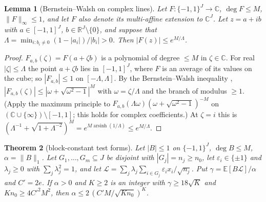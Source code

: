 \documentclass[11pt]{amsart}
\newtheorem{theorem}{Theorem}[section]
\newtheorem{lemma}[theorem]{Lemma}
\theoremstyle{definition}
\newcommand{\R}{\mathbb{R}}
\newcommand{\C}{\mathbb{C}}
\newcommand{\E}{\mathbb{E}}
\newcommand{\arsinh}{\operatorname{arsinh}}
\begin{document}
\begin{lemma}[Bernstein--Walsh on complex lines]\label{lem:BW}
Let $F:\{-1,1\}^J\to\C$, $\deg F\le M$, $\|F\|_\infty\le1$, and let $F$ also denote its multi-affine extension to $\C^J$. Let $z=a+ib$ with $a\in[-1,1]^J$, $b\in\R^J\setminus\{0\}$, and suppose that $\Lambda=\min_{i:b_i\ne0}(1-|a_i|)/|b_i|>0$. Then $|F(z)|\le e^{M/\Lambda}$.
\end{lemma}

\begin{proof}
$F_{a,b}(\zeta)=F(a+\zeta b)$ is a polynomial of degree $\le M$ in $\zeta\in\C$. For real $|\zeta|\le\Lambda$ the point $a+\zeta b$ lies in $[-1,1]^J$, where $F$ is an average of its values on the cube; so $|F_{a,b}|\le1$ on $[-\Lambda,\Lambda]$. By the Bernstein--Walsh inequality \cite[Thm.~5.5.7]{Ran}, $|F_{a,b}(\zeta)|\le|\omega+\sqrt{\omega^2-1}|^M$ with $\omega=\zeta/\Lambda$ and the branch of modulus $\ge1$. (Apply the maximum principle to $F_{a,b}(\Lambda\omega)(\omega+\sqrt{\omega^2-1})^{-M}$ on $(\C\cup\{\infty\})\setminus[-1,1]$; this holds for complex coefficients.) At $\zeta=i$ this is $(\Lambda^{-1}+\sqrt{1+\Lambda^{-2}})^M=e^{M\arsinh(1/\Lambda)}\le e^{M/\Lambda}$.
\end{proof}

\begin{theorem}[block-constant test forms]\label{thm:F}
Let $|B|\le1$ on $\{-1,1\}^J$, $\deg B\le M$, $\alpha=\|B\|_1$. Let $G_1,\dots,G_m\subseteq J$ be disjoint with $|G_j|=n_j\ge n_0$, let $\varepsilon_i\in\{\pm1\}$ and $\lambda_j\ge0$ with $\sum_j\lambda_j^2=1$, and let $\mathcal L=\sum_j\lambda_j\sum_{i\in G_j}\varepsilon_ix_i/\sqrt{n_j}$. Put $\gamma=\E[B\mathcal L]/\alpha$ and $C'=2e$. If $\alpha>0$ and $K\ge2$ is an integer with $\gamma\ge18\sqrt K$ and $Kn_0\ge4C'^2M^2$, then $\alpha\le2\,(C'M/\sqrt{Kn_0})^K$.
\end{theorem}
\end{document}
